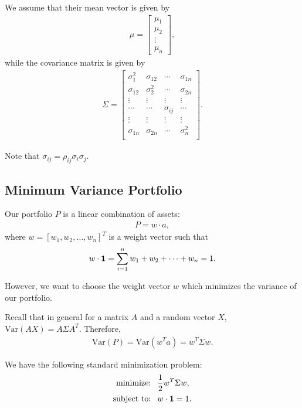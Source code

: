 \documentclass{amsart}
\theoremstyle{plain}
\numberwithin{equation}{section}
\begin{document}
We assume that their mean vector is given by 
\begin{align*}
\mu = 
\begin{bmatrix}
\mu_1\\
\mu_2\\
\vdots\\
\mu_n
\end{bmatrix},
\end{align*}
while the covariance matrix is given by
\begin{align*}
\Sigma = \begin{bmatrix}
\sigma_1^2  & \sigma_{12} & \cdots & \sigma_{1n}\\
\sigma_{12} & \sigma_2^2  & \cdots & \sigma_{2n}\\
\vdots      & \vdots      & \vdots & \vdots \\
\cdots      & \cdots      & \sigma_{ij} & \cdots \\
\vdots      & \vdots      & \vdots & \vdots \\
\sigma_{1n} & \sigma_{2n} & \cdots & \sigma_n^2\\
\end{bmatrix}.
\end{align*}

Note that $\sigma_{ij} = \rho_{ij} \sigma_i \sigma_j$.

\subsection*{Minimum Variance Portfolio}
Our portfolio $P$ is a linear combination of 
assets:
\begin{align*}
P = w \cdot a,
\end{align*}
where $w = [w_1, w_2, \ldots, w_n]^T$ is a weight 
vector such that \
\begin{align*}
w \cdot {\bf 1} = \sum_{i=1}^{n} w_1 + w_2 + \cdots + w_n = 1.
\end{align*}

However, we want to choose the weight vector 
$w$ which minimizes the variance of our 
portfolio.

Recall that in general for a matrix $A$ and a random vector $X$, 
$\mathrm{Var}(AX) = A\Sigma A^T$.
Therefore,
\begin{align*}
\mathrm{Var}(P) = \mathrm{Var}(w^T a) = w^T\Sigma w.
\end{align*}

We have the following standard minimization problem:
\begin{align*}
\textrm{minimize: }   ~ & \frac{1}{2} w^T\Sigma w,\\
\textrm{subject to: } ~ & w \cdot {\bf 1} = 1.
\end{align*}
\end{document}
